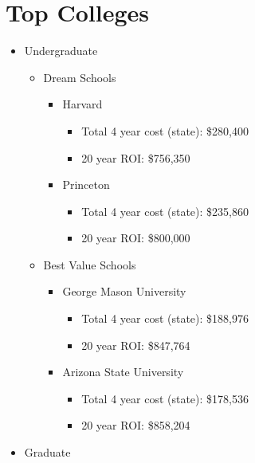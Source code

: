 \section{Top Colleges}
\begin{itemize}
    \item{Undergraduate} 
    \begin{itemize}
        \item{Dream Schools}
            \begin{itemize}
                \item{Harvard}
                    \begin{itemize}
                        \item{Total 4 year cost (state):} \$280,400 
                        \item{20 year ROI:} \$756,350
                    \end{itemize}
                \item{Princeton}
                    \begin{itemize}
                        \item{Total 4 year cost (state):} \$235,860 
                        \item{20 year ROI:} \$800,000
                    \end{itemize}
            \end{itemize}
        \item{Best Value Schools} 
            \begin{itemize}
                \item{George Mason University}
                    \begin{itemize}
                        \item{Total 4 year cost (state):} \$188,976 
                        \item{20 year ROI:} \$847,764
                    \end{itemize}
                \item{Arizona State University}
                    \begin{itemize}
                        \item{Total 4 year cost (state):} \$178,536
                        \item{20 year ROI:} \$858,204
                    \end{itemize}
            \end{itemize}
    \end{itemize}
    \item{Graduate} 

\end{itemize}

